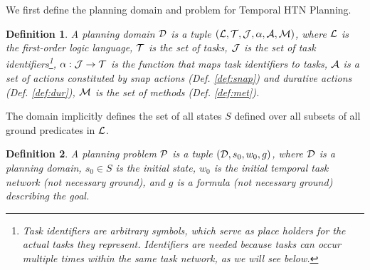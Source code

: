 \documentclass[letterpaper]{article} %
\newtheorem{definition}{Definition}
\begin{document}
 We first define the planning domain and problem for Temporal HTN Planning.
 \begin{definition}
   A \emph{planning domain} $\cal{D}$ is a tuple $({\cal{L}}, {\cal{T}}, {\cal{J}}, \alpha, {\cal{A}}, {\cal{M}})$, where
   $\cal{L}$ is the first-order logic language,
   $\cal{T}$ is the set of tasks,
   $\cal{J}$ is the set of task identifiers\footnote{Task identifiers are arbitrary symbols, which serve as place holders for the actual tasks they represent. Identifiers are needed because tasks can occur multiple times within the same task network, as we will see below.},
   $\alpha: {\cal{J}} \rightarrow {\cal{T}}$ is the function that maps task identifiers to tasks,
   ${\cal{A}}$ is a set of actions constituted by \emph{snap} actions (Def. \ref{def:snap}) and \emph{durative} actions (Def. \ref{def:dur}),
   $\cal{M}$ is the set of methods (Def. \ref{def:met}). %
 \end{definition}

 The domain implicitly defines the set of all states $S$ defined over all subsets of all ground predicates in $\cal{L}$.

 \begin{definition}
 A \emph{planning problem} $\cal{P}$ is a tuple $({\cal{D}}, {s_0}, w_0, g)$, where $\cal{D}$ is a planning domain, $s_0 \in S$ is the initial state, $w_0$ is the initial temporal task network (not necessary ground), and $g$ is a formula (not necessary ground) describing the goal.
 \end{definition}

\end{document}
